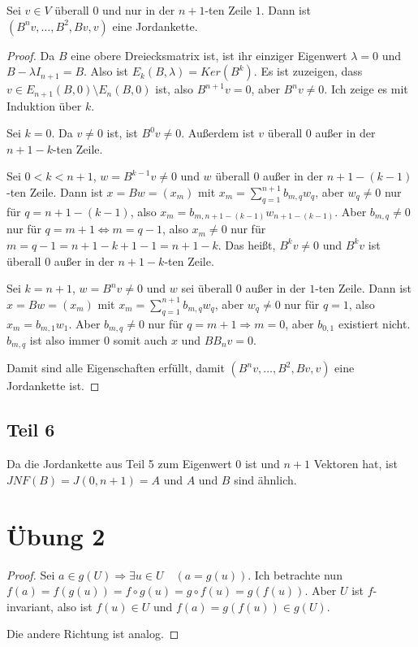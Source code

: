 \documentclass[10pt,a4paper]{article}
\begin{document}
Sei $v \in V$ überall $0$ und nur in der $n + 1$-ten Zeile $1$.
Dann ist $(B^{n}v, \dots, B^{2}, Bv, v)$ eine Jordankette.

\begin{proof}
Da $B$ eine obere Dreiecksmatrix ist, ist ihr einziger Eigenwert $\lambda = 0$ und $B - \lambda I_{n + 1} = B$.
Also ist $E_{k}(B, \lambda) = Ker(B^{k})$. 
Es ist zuzeigen, dass $v \in E_{n + 1}(B, 0) \setminus E_{n}(B, 0)$ ist, also $B^{n + 1}v = 0$, aber $B^{n}v \ne 0$.
Ich zeige es mit Induktion über $k$.

Sei $k = 0$.
Da $v \ne 0$ ist, ist $B^{0}v \ne 0$.
Außerdem ist $v$ überall $0$ außer in der $n + 1 - k$-ten Zeile.

Sei $0 < k < n + 1$, $w = B^{k - 1}v \ne 0$ und $w$ überall $0$ außer in der $n + 1 - (k - 1)$-ten Zeile.
Dann ist $x = Bw = (x_{m})$ mit $x_{m} = \sum_{q = 1}^{n + 1} b_{m, q} w_{q}$, aber $w_{q} \ne 0$ nur für $q = n + 1 - (k - 1)$, also $x_{m} = b_{m, n + 1 - (k - 1)} w_{n + 1 - (k - 1)}$.
Aber $b_{m, q} \ne 0$ nur für $q = m + 1 \Leftrightarrow m = q - 1$, also $x_{m} \ne 0$ nur für $m = q - 1 = n + 1 - k + 1 - 1 = n + 1 - k$.
Das heißt, $B^{k}v \ne 0$ und $B^{k}v$ ist überall $0$ außer in der $n + 1 - k$-ten Zeile.

Sei $k = n + 1$, $w = B^{n}v \ne 0$ und $w$ sei überall $0$ außer in der $1$-ten Zeile.
Dann ist $x = Bw = (x_{m})$ mit $x_{m} = \sum_{q = 1}^{n + 1} b_{m, q} w_{q}$, aber $w_{q} \ne 0$ nur für $q = 1$, also $x_{m} = b_{m, 1} w_{1}$.
Aber $b_{m, q} \ne 0$ nur für $q = m + 1 \Rightarrow m = 0$, aber $b_{0, 1}$ existiert nicht.
$b_{m, q}$ ist also immer $0$ somit auch $x$ und $BB_{n}v = 0$.

Damit sind alle Eigenschaften erfüllt, damit $(B^{n}v, \dots, B^{2}, Bv, v)$ eine Jordankette ist.
\end{proof}

\subsection*{Teil 6}

Da die Jordankette aus Teil 5 zum Eigenwert $0$ ist und $n + 1$ Vektoren hat, ist $JNF(B) = J(0, n + 1) = A$ und $A$ und $B$ sind ähnlich.

\section*{Übung 2}

\begin{proof}
Sei $a \in g(U) \Rightarrow \exists u \in U \quad (a = g(u))$.
Ich betrachte nun $f(a) = f(g(u)) = f \circ g(u) = g \circ f(u) = g(f(u))$.
Aber $U$ ist $f$-invariant, also ist $f(u) \in U$ und $f(a) = g(f(u)) \in g(U)$.

Die andere Richtung ist analog.
\end{proof}
\end{document}
